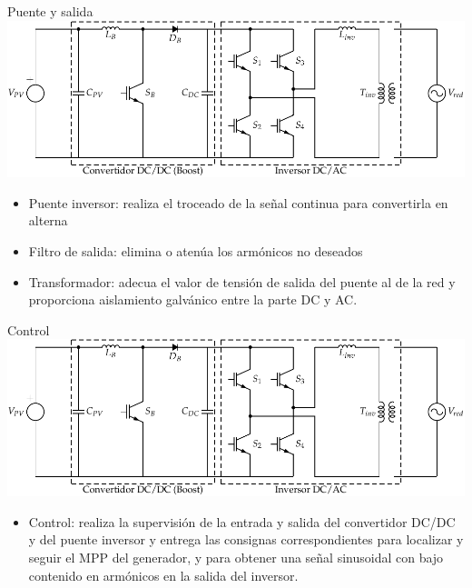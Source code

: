 \documentclass[xcolor={usenames,svgnames,dvipsnames}]{beamer}
\begin{document}
\begin{frame}[label=sec-2-4-2]{Puente y salida}
\includegraphics[width=.9\linewidth]{../figs/InversorPV.pdf}

\begin{itemize}
\item \alert{Puente inversor}: realiza el troceado de la señal continua para
convertirla en alterna

\item \alert{Filtro de salida}: elimina o atenúa los armónicos no deseados

\item \alert{Transformador}: adecua el valor de tensión de salida del puente al
de la red y proporciona aislamiento galvánico entre la parte DC y
AC.
\end{itemize}
\end{frame}

\begin{frame}[label=sec-2-4-3]{Control}
\includegraphics[width=.9\linewidth]{../figs/InversorPV.pdf}

\begin{itemize}
\item \alert{Control}: realiza la supervisión de la entrada y salida del
convertidor DC/DC y del puente inversor y entrega las consignas
correspondientes para localizar y seguir el MPP del generador, y para
obtener una señal sinusoidal con bajo contenido en armónicos en la
salida del inversor.
\end{itemize}
\end{frame}
\end{document}
